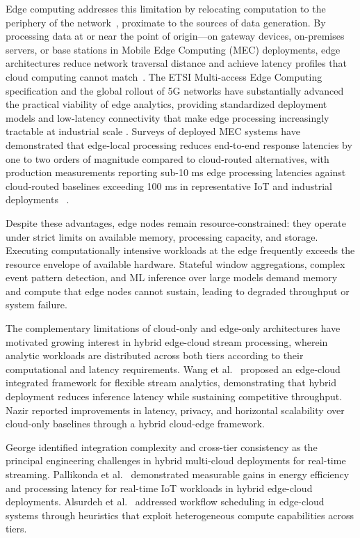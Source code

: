 \documentclass[preprint,review,12pt]{elsarticle}
\begin{document}
Edge computing addresses this limitation by relocating computation to the periphery of the network~\cite{satyanarayanan2017emergence}, proximate to the sources of data generation. By processing data at or near the point of origin—on gateway devices, on-premises servers, or base stations in Mobile Edge Computing (MEC) deployments, edge architectures reduce network traversal distance and achieve latency profiles that cloud computing cannot match~\cite{immadisetty2025edge}. The ETSI Multi-access Edge Computing specification and the global rollout of 5G networks have substantially advanced the practical viability of edge analytics, providing standardized deployment models and low-latency connectivity that make edge processing increasingly tractable at industrial scale \cite{etsi2022mec}. Surveys of deployed MEC systems have demonstrated that edge-local processing reduces end-to-end response latencies by one to two orders of magnitude compared to cloud-routed alternatives, with production measurements reporting sub-10 ms edge processing latencies against cloud-routed baselines exceeding 100 ms in representative IoT and industrial deployments~\cite{liu2019edge} \cite{mach2017mec}. 

Despite these advantages, edge nodes remain resource-constrained: they operate under strict limits on available memory, processing capacity, and storage. Executing computationally intensive workloads at the edge frequently exceeds the resource envelope of available hardware. Stateful window aggregations, complex event pattern detection, and ML inference over large models demand memory and compute that edge nodes cannot sustain, leading to degraded throughput or system failure.

The complementary limitations of cloud-only and edge-only architectures have motivated growing interest in hybrid edge-cloud stream processing, wherein analytic workloads are distributed across both tiers according to their computational and latency requirements. Wang et al.~\cite{wang2022edgecloud} proposed an edge-cloud integrated framework for flexible stream analytics, demonstrating that hybrid deployment reduces inference latency while sustaining competitive throughput. Nazir \cite{nazir2022hybrid} reported improvements in latency, privacy, and horizontal scalability over cloud-only baselines through a hybrid cloud-edge framework. 

George \cite{george2022hybrid} identified integration complexity and cross-tier consistency as the principal engineering challenges in hybrid multi-cloud deployments for real-time streaming. Pallikonda et al.~\cite{pallikonda2025iot} demonstrated measurable gains in energy efficiency and processing latency for real-time IoT workloads in hybrid edge-cloud deployments. Alsurdeh et al.~\cite{alsurdeh2021hybrid} addressed workflow scheduling in edge-cloud systems through heuristics that exploit heterogeneous compute capabilities across tiers.
\end{document}
